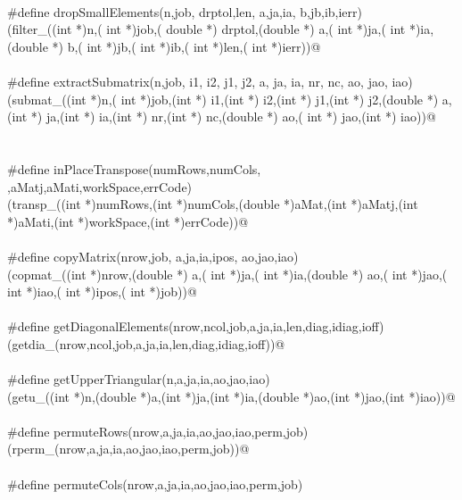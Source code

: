 \documentclass[12pt]{article}
\begin{document}
\begin{flushleft}
\begin{minipage}{\linewidth}
\begin{list}{}{}
\mbox{}\verb@@\\
\mbox{}\verb@#define dropSmallElements(n,job, drptol,len, a,ja,ia, b,jb,ib,ierr)\@\\
\mbox{}\verb@(filter_((int *)n,( int *)job,( double *) drptol,(double *) a,( int *)ja,( int *)ia,(double *) b,( int *)jb,( int *)ib,( int *)len,( int *)ierr))@\\
\mbox{}\verb@@\\
\mbox{}\verb@#define extractSubmatrix(n,job, i1, i2, j1, j2, a, ja, ia, nr, nc, ao,  jao, iao)\@\\
\mbox{}\verb@(submat_((int *)n,( int *)job,(int *) i1,(int *) i2,(int *) j1,(int *) j2,(double *) a,(int *) ja,(int *) ia,(int *) nr,(int *) nc,(double *) ao,( int *)       jao,(int *) iao))@\\
\mbox{}\verb@@\\
\mbox{}\verb@@\\
\mbox{}\verb@#define inPlaceTranspose(numRows,numCols, \@\\
\mbox{}\verb@aMat,aMatj,aMati,workSpace,errCode) \@\\
\mbox{}\verb@(transp_((int *)numRows,(int *)numCols,(double *)aMat,(int *)aMatj,(int *)aMati,(int *)workSpace,(int *)errCode))@\\
\mbox{}\verb@@\\
\mbox{}\verb@#define copyMatrix(nrow,job, a,ja,ia,ipos, ao,jao,iao)\@\\
\mbox{}\verb@(copmat_((int *)nrow,(double *) a,( int *)ja,( int *)ia,(double *) ao,( int *)jao,( int *)iao,( int *)ipos,( int *)job))@\\
\mbox{}\verb@@\\
\mbox{}\verb@#define getDiagonalElements(nrow,ncol,job,a,ja,ia,len,diag,idiag,ioff)\@\\
\mbox{}\verb@(getdia_(nrow,ncol,job,a,ja,ia,len,diag,idiag,ioff))@\\
\mbox{}\verb@@\\
\mbox{}\verb@#define getUpperTriangular(n,a,ja,ia,ao,jao,iao)\@\\
\mbox{}\verb@(getu_((int *)n,(double *)a,(int *)ja,(int *)ia,(double *)ao,(int *)jao,(int *)iao))@\\
\mbox{}\verb@@\\
\mbox{}\verb@#define permuteRows(nrow,a,ja,ia,ao,jao,iao,perm,job) \@\\
\mbox{}\verb@(rperm_(nrow,a,ja,ia,ao,jao,iao,perm,job))@\\
\mbox{}\verb@@\\
\mbox{}\verb@#define permuteCols(nrow,a,ja,ia,ao,jao,iao,perm,job) \@\\

\end{list}
\end{minipage}
\end{flushleft}
\end{document}
